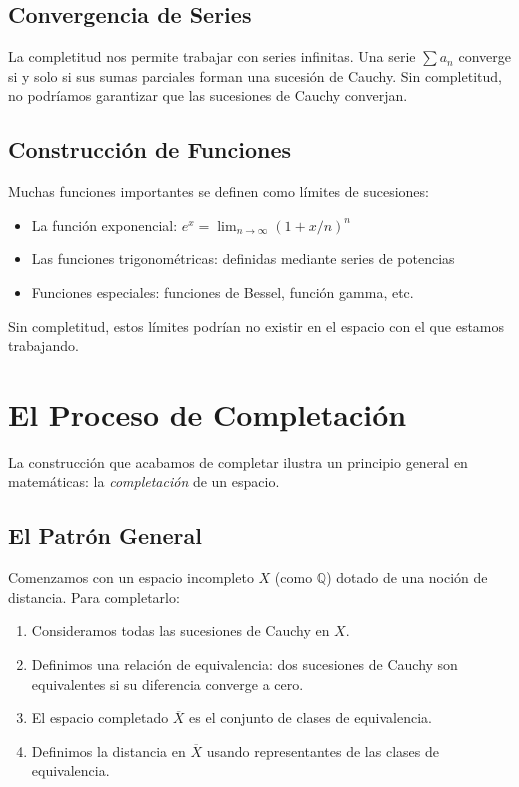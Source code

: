 \subsection{Convergencia de Series}

La completitud nos permite trabajar con series infinitas. Una serie
$\sum a_n$ converge si y solo si sus sumas parciales forman una sucesión de Cauchy.
Sin completitud, no podríamos garantizar que las sucesiones de Cauchy converjan.

\subsection{Construcción de Funciones}

Muchas funciones importantes se definen como límites de sucesiones:
\begin{itemize}
  \item La función exponencial: $e^x = \lim_{n\to\infty}(1 + x/n)^n$
  \item Las funciones trigonométricas: definidas mediante series de potencias
  \item Funciones especiales: funciones de Bessel, función gamma, etc.
\end{itemize}
Sin completitud, estos límites podrían no existir en el espacio con el que estamos
trabajando.

\section{El Proceso de Completación}

La construcción que acabamos de completar ilustra un principio general en
matemáticas: la \emph{completación} de un espacio.

\subsection{El Patrón General}

Comenzamos con un espacio incompleto $X$ (como $\mathbb{Q}$) dotado de una noción
de distancia. Para completarlo:
\begin{enumerate}
  \item Consideramos todas las sucesiones de Cauchy en $X$.
  \item Definimos una relación de equivalencia: dos sucesiones de Cauchy son
        equivalentes si su diferencia converge a cero.
  \item El espacio completado $\overline{X}$ es el conjunto de clases de
        equivalencia.
  \item Definimos la distancia en $\overline{X}$ usando representantes de las
        clases de equivalencia.
\end{enumerate}

